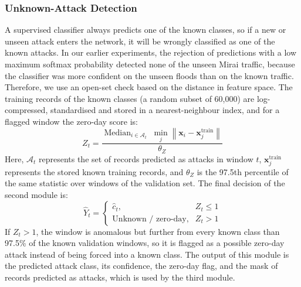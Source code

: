 \documentclass[]{interact}
\theoremstyle{plain}%
\theoremstyle{definition}
\theoremstyle{remark}
\begin{document}
\subsubsection{Unknown-Attack Detection}
A supervised classifier always predicts one of the known classes, so if a new or unseen attack enters the network, it will be wrongly classified as one of the known attacks. In our earlier experiments, the rejection of predictions with a low maximum softmax probability detected none of the unseen Mirai traffic, because the classifier was more confident on the unseen floods than on the known traffic. Therefore, we use an open-set check based on the distance in feature space. The training records of the known classes (a random subset of 60,000) are log-compressed, standardised and stored in a nearest-neighbour index, and for a flagged window the zero-day score is:
\begin{equation}
  Z_t = \frac{\operatorname{Median}_{i \in \mathcal{A}_t}\; \min_{j} \left\lVert \mathbf{x}_i - \mathbf{x}_j^{\text{train}} \right\rVert}{\theta_Z}
\end{equation}
Here, $\mathcal{A}_t$ represents the set of records predicted as attacks in window $t$, $\mathbf{x}_j^{\text{train}}$ represents the stored known training records, and $\theta_Z$ is the 97.5th percentile of the same statistic over windows of the validation set. The final decision of the second module is:
\begin{equation}
  \hat{Y}_t =
  \begin{cases}
    \hat{c}_t, & Z_t \le 1\\
    \text{Unknown / zero-day}, & Z_t > 1
  \end{cases}
\end{equation}
If $Z_t > 1$, the window is anomalous but further from every known class than 97.5\% of the known validation windows, so it is flagged as a possible zero-day attack instead of being forced into a known class. The output of this module is the predicted attack class, its confidence, the zero-day flag, and the mask of records predicted as attacks, which is used by the third module.


\end{document}
